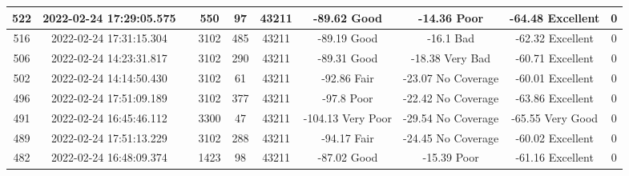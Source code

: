 \begin{longtable*}{|c|c|c|c|c|c|c|c|c|c|}
522&2022-02-24 17:29:05.575&&550&97&43211& -89.62    Good        & -14.36    Poor        & -64.48    Excellent   & 0\\\hline
{}516&2022-02-24 17:31:15.304&&3102&485&43211& -89.19    Good        & -16.1     Bad         & -62.32    Excellent   & 0\\\hline
{}506&2022-02-24 14:23:31.817&&3102&290&43211& -89.31    Good        & -18.38    Very Bad    & -60.71    Excellent   & 0\\\hline
{}502&2022-02-24 14:14:50.430&&3102&61&43211& -92.86    Fair        & -23.07    No Coverage & -60.01    Excellent   & 0\\\hline
{}496&2022-02-24 17:51:09.189&&3102&377&43211& -97.8     Poor        & -22.42    No Coverage & -63.86    Excellent   & 0\\\hline
{}491&2022-02-24 16:45:46.112&&3300&47&43211& -104.13   Very Poor   & -29.54    No Coverage & -65.55    Very Good   & 0\\\hline
{}489&2022-02-24 17:51:13.229&&3102&288&43211& -94.17    Fair        & -24.45    No Coverage & -60.02    Excellent   & 0\\\hline
{}482&2022-02-24 16:48:09.374&&1423&98&43211& -87.02    Good        & -15.39    Poor        & -61.16    Excellent   & 0\\\hline

\end{longtable*}
